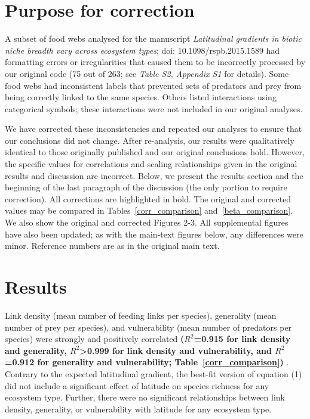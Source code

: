 \documentclass[12pt]{article}
\begin{document}
\begin{spacing}{2.0}

\section*{Purpose for correction}

    A subset of food webs analysed for the manuscript \emph{Latitudinal gradients in biotic niche breadth vary across ecosystem types}; doi: 10.1098/rspb.2015.1589 had formatting errors or irregularities that caused them to be incorrectly processed by our original code (75 out of 263; see \emph{Table S2, Appendix S1} for details). Some food webs had inconsistent labels that prevented sets of predators and prey from being correctly linked to the same species. Others listed interactions using categorical symbols; these interactions were not included in our original analyses.


    We have corrected these inconsistencies and repeated our analyses to ensure that our conclusions did not change. After re-analysis, our results were qualitatively identical to those originally published and our original conclusions hold. However, the specific values for correlations and scaling relationships given in the original results and discussion are incorrect. Below, we present the results section and the beginning of the last paragraph of the discussion (the only portion to require correction). All corrections are highlighted in bold. The original and corrected values may be compared in Tables~\ref{corr_comparison} and~\ref{beta_comparison}. We also show the original and corrected Figures 2-3.  All supplemental figures have also been updated; as with the main-text figures below, any differences were minor. Reference numbers are as in the original main text.


\section*{Results}

    Link density (mean number of feeding links per species), generality (mean
    number of prey per species), and vulnerability (mean number of predators per
    species) were strongly and positively correlated 
    \textbf{($R^2$=0.915 for link
    density and generality, $R^2$\textgreater0.999 for link density and
    vulnerability, and $R^2$=0.912 for generality and vulnerability; Table~\ref{corr_comparison})}
    . Contrary
    to the expected latitudinal gradient, the best-fit version of
    equation (1) did not include a significant
    effect of latitude on species richness for any ecosystem type. Further, there were no significant
    relationships between link density, generality, or vulnerability with
    latitude for any ecosystem type.



\end{spacing}
\end{document}
